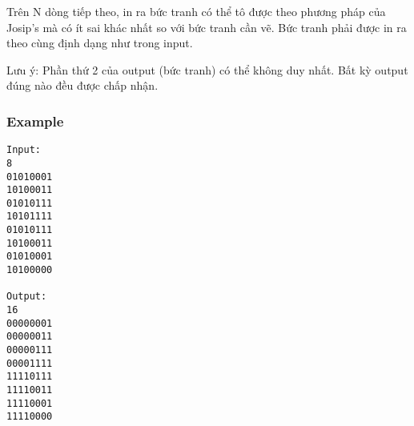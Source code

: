    Trên N dòng tiếp theo, in ra bức tranh có thể tô được theo phương pháp của Josip's mà có ít sai khác nhất so với bức tranh cần vẽ. Bức tranh phải được in ra theo cùng định dạng như trong input.  

   Lưu ý: Phần thứ 2 của output (bức tranh) có thể không duy nhất. Bất kỳ output đúng nào đều được chấp nhận.  

\subsubsection{   Example  }
\begin{verbatim}
Input:
8
01010001
10100011
01010111
10101111
01010111
10100011
01010001
10100000

Output:
16
00000001
00000011
00000111
00001111
11110111
11110011
11110001
11110000
\end{verbatim}